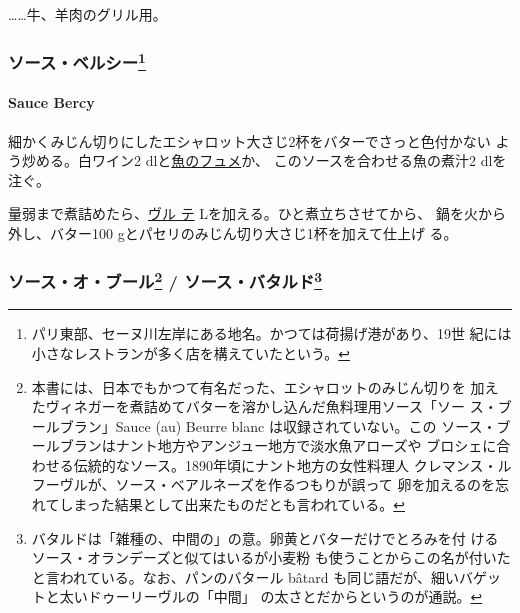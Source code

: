\begin{recette}
\ldots{}\ldots{}牛、羊肉のグリル用。

\maeaki

\hypertarget{ux30bdux30fcux30b9ux30d9ux30ebux30b7ux30fc13}{%
\subsubsection[ソース・ベルシー]{\texorpdfstring{ソース・ベルシー\footnote{パリ東部、セーヌ川左岸にある地名。かつては荷揚げ港があり、19世
  紀には小さなレストランが多く店を構えていたという。}}{ソース・ベルシー}}\label{ux30bdux30fcux30b9ux30d9ux30ebux30b7ux30fc13}}

\hypertarget{sauce-bercy}{%
\paragraph{Sauce Bercy}\label{sauce-bercy}}

 

細かくみじん切りにしたエシャロット大さじ2杯をバターでさっと色付かない
よう炒める。白ワイン2\undemi{}
dlと\protect\hyperlink{fumet-de-poisson}{魚のフュメ}か、
このソースを合わせる魚の煮汁2\undemi{} dlを注ぐ。

\deuxtiers{}量弱まで煮詰めたら、\protect\hyperlink{veloute-de-poisson}{ヴル
テ}\troisquarts{} Lを加える。ひと煮立ちさせてから、
鍋を火から外し、バター100 gとパセリのみじん切り大さじ1杯を加えて仕上げ
る。

\maeaki

\hypertarget{ux30bdux30fcux30b9ux30aaux30d6ux30fcux30eb16-ux30bdux30fcux30b9ux30d0ux30bfux30ebux30c914}{%
\subsubsection[ソース・オ・ブール /
ソース・バタルド]{\texorpdfstring{ソース・オ・ブール\footnote{本書には、日本でもかつて有名だった、エシャロットのみじん切りを
  加えたヴィネガーを煮詰めてバターを溶かし込んだ魚料理用ソース「ソー
  ス・ブールブラン」Sauce (au) Beurre blanc は収録されていない。この
  ソース・ブールブランはナント地方やアンジュー地方で淡水魚アローズや
  ブロシェに合わせる伝統的なソース。1890年頃にナント地方の女性料理人
  クレマンス・ルフーヴルが、ソース・ベアルネーズを作るつもりが誤って
  卵を加えるのを忘れてしまった結果として出来たものだとも言われている。}
/ ソース・バタルド\footnote{バタルドは「雑種の、中間の」の意。卵黄とバターだけでとろみを付
  ける\protect\hypertarget{sauce-hollandaise}{}{ソース・オランデーズ}と似てはいるが小麦粉
  も使うことからこの名が付いたと言われている。なお、パンのバタール
  bâtard も同じ語だが、細いバゲットと太いドゥーリーヴルの「中間」
  の太さとだからというのが通説。}}{ソース・オ・ブール / ソース・バタルド}}\label{ux30bdux30fcux30b9ux30aaux30d6ux30fcux30eb16-ux30bdux30fcux30b9ux30d0ux30bfux30ebux30c914}}


\end{recette}
